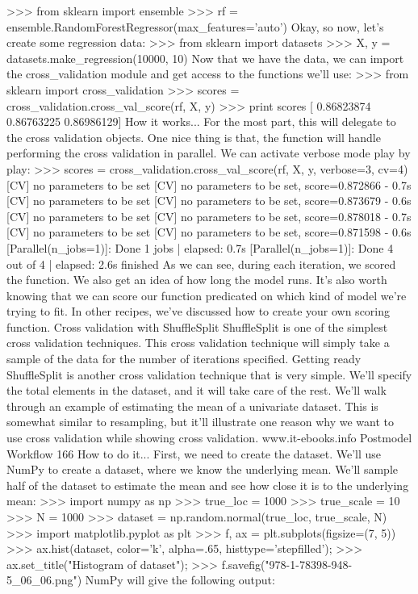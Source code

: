 >>> from sklearn import ensemble
>>> rf = ensemble.RandomForestRegressor(max_features='auto')
Okay, so now, let's create some regression data:
>>> from sklearn import datasets
>>> X, y = datasets.make_regression(10000, 10)
Now that we have the data, we can import the cross_validation module and get access
to the functions we'll use:
>>> from sklearn import cross_validation
>>> scores = cross_validation.cross_val_score(rf, X, y)
>>> print scores
[ 0.86823874 0.86763225 0.86986129]
How it works...
For the most part, this will delegate to the cross validation objects. One nice thing is that, the
function will handle performing the cross validation in parallel.
We can activate verbose mode play by play:
>>> scores = cross_validation.cross_val_score(rf, X, y, verbose=3,
cv=4)
[CV] no parameters to be set
[CV] no parameters to be set, score=0.872866 - 0.7s
[CV] no parameters to be set
[CV] no parameters to be set, score=0.873679 - 0.6s
[CV] no parameters to be set
[CV] no parameters to be set, score=0.878018 - 0.7s
[CV] no parameters to be set
[CV] no parameters to be set, score=0.871598 - 0.6s
[Parallel(n_jobs=1)]: Done 1 jobs | elapsed: 0.7s
[Parallel(n_jobs=1)]: Done 4 out of 4 | elapsed: 2.6s finished
As we can see, during each iteration, we scored the function. We also get an idea of how long
the model runs.
It's also worth knowing that we can score our function predicated on which kind of model we're
trying to fit. In other recipes, we've discussed how to create your own scoring function.
Cross validation with ShuffleSplit
ShuffleSplit is one of the simplest cross validation techniques. This cross validation technique
will simply take a sample of the data for the number of iterations specified.
Getting ready
ShuffleSplit is another cross validation technique that is very simple. We'll specify the total
elements in the dataset, and it will take care of the rest. We'll walk through an example of
estimating the mean of a univariate dataset. This is somewhat similar to resampling, but it'll
illustrate one reason why we want to use cross validation while showing cross validation.
www.it-ebooks.info
Postmodel Workflow
166
How to do it...
First, we need to create the dataset. We'll use NumPy to create a dataset, where we know the
underlying mean. We'll sample half of the dataset to estimate the mean and see how close it
is to the underlying mean:
>>> import numpy as np
>>> true_loc = 1000
>>> true_scale = 10
>>> N = 1000
>>> dataset = np.random.normal(true_loc, true_scale, N)
>>> import matplotlib.pyplot as plt
>>> f, ax = plt.subplots(figsize=(7, 5))
>>> ax.hist(dataset, color='k', alpha=.65, histtype='stepfilled');
>>> ax.set_title("Histogram of dataset");
>>> f.savefig("978-1-78398-948-5_06_06.png")
NumPy will give the following output:


